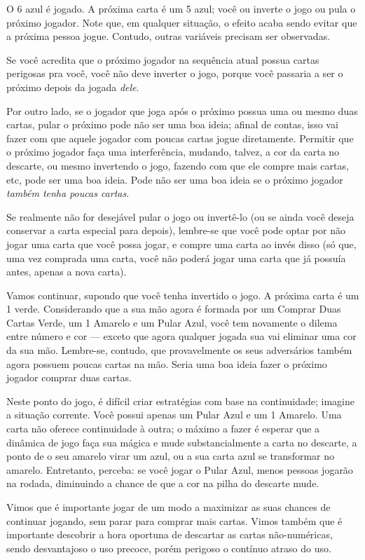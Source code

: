O 6 azul é jogado. A próxima carta é um 5 azul; você ou inverte o jogo ou pula o próximo jogador. Note que, em qualquer situação, o efeito acaba sendo evitar que a próxima pessoa jogue. Contudo, outras variáveis precisam ser observadas.

Se você acredita que o próximo jogador na sequência atual possua cartas perigosas pra você, você não deve inverter o jogo, porque você passaria a ser o próximo depois da jogada \textit{dele}.

Por outro lado, se o jogador que joga após o próximo possua uma ou mesmo duas cartas, pular o próximo pode não ser uma boa ideia; afinal de contas, isso vai fazer com que aquele jogador com poucas cartas jogue diretamente. Permitir que o próximo jogador faça uma interferência, mudando, talvez, a cor da carta no descarte, ou mesmo invertendo o jogo, fazendo com que ele compre mais cartas, etc, pode ser uma boa ideia. Pode não ser uma boa ideia se o próximo jogador \textit{também tenha poucas cartas}.

Se realmente não for desejável pular o jogo ou invertê-lo (ou se ainda você deseja conservar a carta especial para depois), lembre-se que você pode optar por não jogar uma carta que você possa jogar, e compre uma carta ao invés disso (só que, uma vez comprada uma carta, você não poderá jogar uma carta que já possuía antes, apenas a nova carta).

Vamos continuar, supondo que você tenha invertido o jogo. A próxima carta é um 1 verde. Considerando que a sua mão agora é formada por um Comprar Duas Cartas Verde, um 1 Amarelo e um Pular Azul, você tem novamente o dilema entre número e cor --- exceto que agora qualquer jogada sua vai eliminar uma cor da sua mão. Lembre-se, contudo, que provavelmente os seus adversários também agora possuem poucas cartas na mão. Seria uma boa ideia fazer o próximo jogador comprar duas cartas.

Neste ponto do jogo, é difícil criar estratégias com base na continuidade; imagine a situação corrente. Você possui apenas um Pular Azul e um 1 Amarelo. Uma carta não oferece continuidade à outra; o máximo a fazer é esperar que a dinâmica de jogo faça sua mágica e mude substancialmente a carta no descarte, a ponto de o seu amarelo virar um azul, ou a sua carta azul se transformar no amarelo. Entretanto, perceba: se você jogar o Pular Azul, menos pessoas jogarão na rodada, diminuindo a chance de que a cor na pilha do descarte mude.

Vimos que é importante jogar de um modo a maximizar as suas chances de continuar jogando, sem parar para comprar mais cartas. Vimos também que é importante descobrir a hora oportuna de descartar as cartas não-numéricas, sendo desvantajoso o uso precoce, porém perigoso o contínuo atraso do uso.

